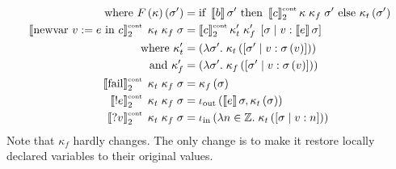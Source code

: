 \begin{enumcirc}
\begin{align*}
		\textrm{where } F \left( \kappa \right)\left( \sigma^\prime \right)                         &
		= \textrm{if } \left\llbracket b \right\rrbracket\sigma^\prime \textrm{ then } \left\llbracket c \right\rrbracket^{\textrm{\tiny cont}}_2\kappa\;\kappa_f\;\sigma^\prime \textrm{ else } \kappa_t\left( \sigma^\prime \right)                                                           \\
		\left\llbracket \textrm{newvar } v := e \textrm{ in } c \right\rrbracket^{\textrm{\tiny cont}}_2\;\kappa_t\;\kappa_f\;\sigma    &
		= \left\llbracket c \right\rrbracket^{\textrm{\tiny cont}}_2
		\kappa_t^\prime\;\kappa_f^\prime\;
		\left[ \sigma \; \middle\vert \; v: \left\llbracket e \right\rrbracket{\sigma} \right]                                                    \\
		\textrm{where } \kappa_t^\prime                                               &
		= \left( \lambda \sigma^\prime.\; \kappa_t\left( \left[ \sigma^\prime \; \middle\vert \; v:\sigma\left( v \right) \right] \right) \right) \\
		\textrm{and } \kappa_f^\prime                                                 &
		= \left( \lambda \sigma^\prime.\; \kappa_f\left( \left[ \sigma^\prime \; \middle\vert \; v:\sigma\left( v \right) \right] \right) \right) \\
		\left\llbracket \textrm{fail} \right\rrbracket^{\textrm{\tiny cont}}_2\;\kappa_t\;\kappa_f\;\sigma            &
		= \kappa_f\left( \sigma \right)                                                                  \\
		\left\llbracket \textrm{!} e \right\rrbracket^{\textrm{\tiny cont}}_2\;\kappa_t\;\kappa_f\;\sigma          &
		= \iota_{\textrm{out}}\left( \left\llbracket e \right\rrbracket\sigma, \kappa_t\left( \sigma \right) \right)                                \\
		\left\llbracket \textrm{?} v \right\rrbracket^{\textrm{\tiny cont}}_2\;\kappa_t\;\kappa_f\;\sigma           &
		= \iota_{\textrm{in}}\left( \lambda n \in \mathbb{Z}.\; \kappa_t\left( \left[ \sigma \; \middle\vert \; v:n \right] \right) \right)                       \\
	\end{align*}
	Note that $\kappa_f$ hardly changes.
	The only change is to make it restore locally declared variables to their
	original values.
\end{enumcirc}